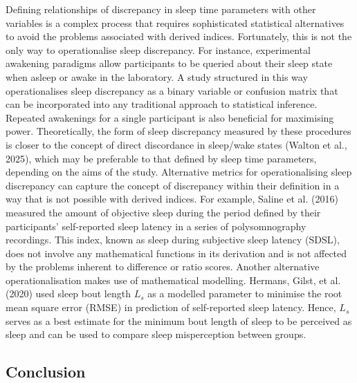 \documentclass[
]{article}
\begin{document}
Defining relationships of discrepancy in sleep time parameters with other variables is a complex process that requires sophisticated statistical alternatives to avoid the problems associated with derived indices. Fortunately, this is not the only way to operationalise sleep discrepancy. For instance, experimental awakening paradigms allow participants to be queried about their sleep state when asleep or awake in the laboratory. A study structured in this way operationalises sleep discrepancy as a binary variable or confusion matrix that can be incorporated into any traditional approach to statistical inference. Repeated awakenings for a single participant is also beneficial for maximising power. Theoretically, the form of sleep discrepancy measured by these procedures is closer to the concept of direct discordance in sleep/wake states (Walton et al., 2025), which may be preferable to that defined by sleep time parameters, depending on the aims of the study. Alternative metrics for operationalising sleep discrepancy can capture the concept of discrepancy within their definition in a way that is not possible with derived indices. For example, Saline et al. (2016) measured the amount of objective sleep during the period defined by their participants' self-reported sleep latency in a series of polysomnography recordings. This index, known as sleep during subjective sleep latency (SDSL), does not involve any mathematical functions in its derivation and is not affected by the problems inherent to difference or ratio scores. Another alternative operationalisation makes use of mathematical modelling. Hermans, Gilst, et al. (2020) used sleep bout length \(L_s\) as a modelled parameter to minimise the root mean square error (RMSE) in prediction of self-reported sleep latency. Hence, \(L_s\) serves as a best estimate for the minimum bout length of sleep to be perceived as sleep and can be used to compare sleep misperception between groups.

\subsection{Conclusion}\label{conclusion-1}
\end{document}
